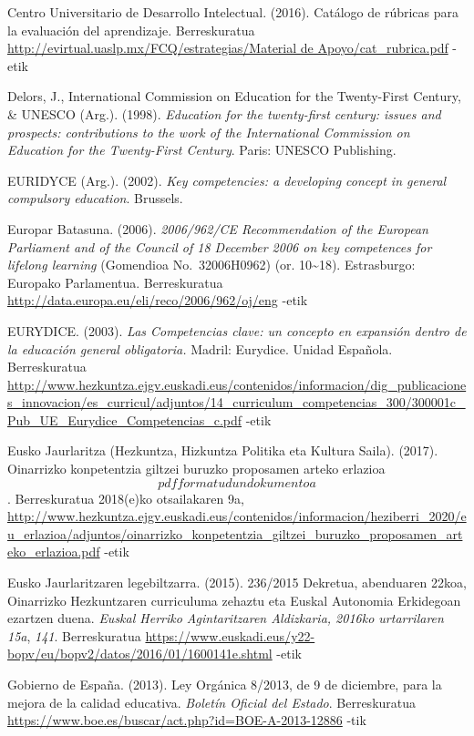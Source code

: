 \documentclass[
]{book}
\begin{document}
Centro Universitario de Desarrollo Intelectual. (2016). Catálogo de rúbricas para la evaluación del aprendizaje. Berreskuratua \href{http://evirtual.uaslp.mx/FCQ/estrategias/Material\%20de\%20Apoyo/cat_rubrica.pdf}{http://evirtual.uaslp.mx/FCQ/estrategias/Material de Apoyo/cat\_rubrica.pdf} -etik

Delors, J., International Commission on Education for the Twenty-First Century, \& UNESCO (Arg.). (1998). \emph{Education for the twenty-first century: issues and prospects: contributions to the work of the International Commission on Education for the Twenty-First Century}. Paris: UNESCO Publishing.

EURIDYCE (Arg.). (2002). \emph{Key competencies: a developing concept in general compulsory education}. Brussels.

Europar Batasuna. (2006). \emph{2006/962/CE Recommendation of the European Parliament and of the Council of 18 December 2006 on key competences for lifelong learning} (Gomendioa No.~32006H0962) (or. 10\textasciitilde18). Estrasburgo: Europako Parlamentua. Berreskuratua \url{http://data.europa.eu/eli/reco/2006/962/oj/eng} -etik

EURYDICE. (2003). \emph{Las Competencias clave: un concepto en expansión dentro de la educación general obligatoria.} Madril: Eurydice. Unidad Española. Berreskuratua \url{http://www.hezkuntza.ejgv.euskadi.eus/contenidos/informacion/dig_publicaciones_innovacion/es_curricul/adjuntos/14_curriculum_competencias_300/300001c_Pub_UE_Eurydice_Competencias_c.pdf} -etik

Eusko Jaurlaritza (Hezkuntza, Hizkuntza Politika eta Kultura Saila). (2017). Oinarrizko konpetentzia giltzei buruzko proposamen arteko erlazioa \[pdf formatudun dokumentoa\]. Berreskuratua 2018(e)ko otsailakaren 9a, \url{http://www.hezkuntza.ejgv.euskadi.eus/contenidos/informacion/heziberri_2020/eu_erlazioa/adjuntos/oinarrizko_konpetentzia_giltzei_buruzko_proposamen_arteko_erlazioa.pdf} -etik

Eusko Jaurlaritzaren legebiltzarra. (2015). 236/2015 Dekretua, abenduaren 22koa, Oinarrizko Hezkuntzaren curriculuma zehaztu eta Euskal Autonomia Erkidegoan ezartzen duena. \emph{Euskal Herriko Agintaritzaren Aldizkaria, 2016ko urtarrilaren 15a}, \emph{141}. Berreskuratua \url{https://www.euskadi.eus/y22-bopv/eu/bopv2/datos/2016/01/1600141e.shtml} -etik

Gobierno de España. (2013). Ley Orgánica 8/2013, de 9 de diciembre, para la mejora de la calidad educativa. \emph{Boletín Oficial del Estado}. Berreskuratua \url{https://www.boe.es/buscar/act.php?id=BOE-A-2013-12886} -tik
\end{document}
